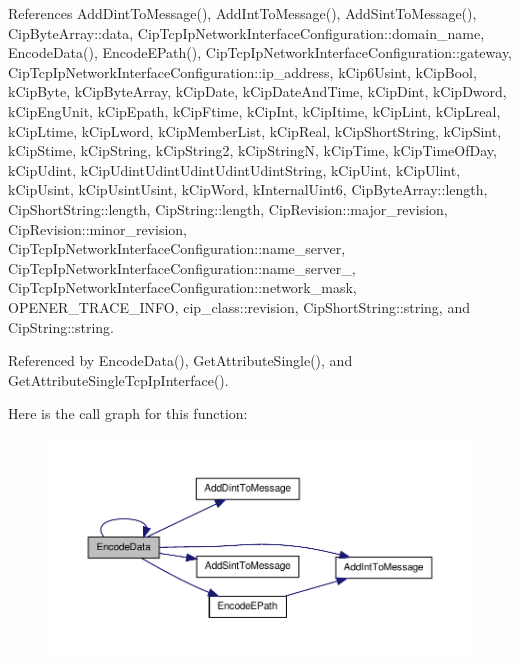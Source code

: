 \-References \-Add\-Dint\-To\-Message(), \-Add\-Int\-To\-Message(), \-Add\-Sint\-To\-Message(), \-Cip\-Byte\-Array\-::data, \-Cip\-Tcp\-Ip\-Network\-Interface\-Configuration\-::domain\-\_\-name, \-Encode\-Data(), \-Encode\-E\-Path(), \-Cip\-Tcp\-Ip\-Network\-Interface\-Configuration\-::gateway, \-Cip\-Tcp\-Ip\-Network\-Interface\-Configuration\-::ip\-\_\-address, k\-Cip6\-Usint, k\-Cip\-Bool, k\-Cip\-Byte, k\-Cip\-Byte\-Array, k\-Cip\-Date, k\-Cip\-Date\-And\-Time, k\-Cip\-Dint, k\-Cip\-Dword, k\-Cip\-Eng\-Unit, k\-Cip\-Epath, k\-Cip\-Ftime, k\-Cip\-Int, k\-Cip\-Itime, k\-Cip\-Lint, k\-Cip\-Lreal, k\-Cip\-Ltime, k\-Cip\-Lword, k\-Cip\-Member\-List, k\-Cip\-Real, k\-Cip\-Short\-String, k\-Cip\-Sint, k\-Cip\-Stime, k\-Cip\-String, k\-Cip\-String2, k\-Cip\-String\-N, k\-Cip\-Time, k\-Cip\-Time\-Of\-Day, k\-Cip\-Udint, k\-Cip\-Udint\-Udint\-Udint\-Udint\-Udint\-String, k\-Cip\-Uint, k\-Cip\-Ulint, k\-Cip\-Usint, k\-Cip\-Usint\-Usint, k\-Cip\-Word, k\-Internal\-Uint6, \-Cip\-Byte\-Array\-::length, \-Cip\-Short\-String\-::length, \-Cip\-String\-::length, \-Cip\-Revision\-::major\-\_\-revision, \-Cip\-Revision\-::minor\-\_\-revision, \-Cip\-Tcp\-Ip\-Network\-Interface\-Configuration\-::name\-\_\-server, \-Cip\-Tcp\-Ip\-Network\-Interface\-Configuration\-::name\-\_\-server\-\_, \-Cip\-Tcp\-Ip\-Network\-Interface\-Configuration\-::network\-\_\-mask, \-O\-P\-E\-N\-E\-R\-\_\-\-T\-R\-A\-C\-E\-\_\-\-I\-N\-F\-O, cip\-\_\-class\-::revision, \-Cip\-Short\-String\-::string, and \-Cip\-String\-::string.



\-Referenced by \-Encode\-Data(), \-Get\-Attribute\-Single(), and \-Get\-Attribute\-Single\-Tcp\-Ip\-Interface().



\-Here is the call graph for this function\-:
\nopagebreak
\begin{figure}[H]
\begin{center}
\leavevmode
\includegraphics[width=350pt]{d2/dc9/group__CIP__API_gaece1b7dd2aeec306cb33b86b2ee21980_cgraph}
\end{center}
\end{figure}




